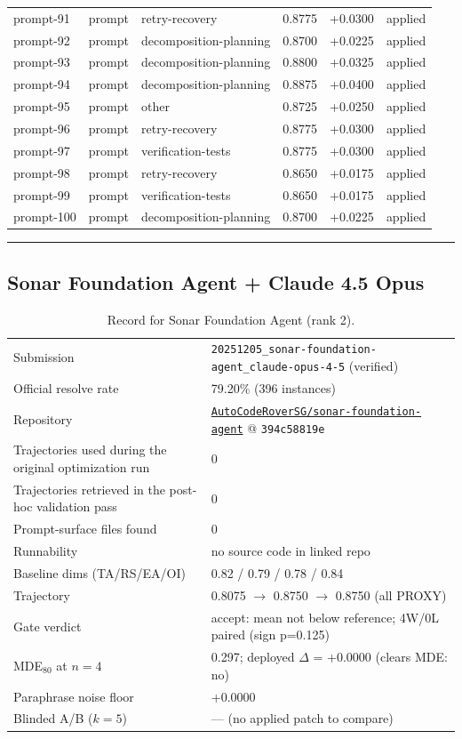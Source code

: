 \begin{center}
\begin{longtable}{llp{5.2cm}rrl}
prompt-91 & prompt & retry-recovery & 0.8775 & +0.0300 & applied \\
prompt-92 & prompt & decomposition-planning & 0.8700 & +0.0225 & applied \\
prompt-93 & prompt & decomposition-planning & 0.8800 & +0.0325 & applied \\
prompt-94 & prompt & decomposition-planning & 0.8875 & +0.0400 & applied \\
prompt-95 & prompt & other & 0.8725 & +0.0250 & applied \\
prompt-96 & prompt & retry-recovery & 0.8775 & +0.0300 & applied \\
prompt-97 & prompt & verification-tests & 0.8775 & +0.0300 & applied \\
prompt-98 & prompt & retry-recovery & 0.8650 & +0.0175 & applied \\
prompt-99 & prompt & verification-tests & 0.8650 & +0.0175 & applied \\
prompt-100 & prompt & decomposition-planning & 0.8700 & +0.0225 & applied \\
\bottomrule\end{longtable}\end{center}
\par\bigskip\hrule\bigskip
\subsection{Sonar Foundation Agent + Claude 4.5 Opus}
\label{app:agent2}
\begin{table}[H]\centering\scriptsize
\caption{Record for Sonar Foundation Agent (rank 2).}
\begin{tabular}{lp{8.2cm}}\toprule
Submission & \texttt{20251205\_\allowbreak{}sonar-foundation-agent\_\allowbreak{}claude-opus-4-5} (verified) \\
Official resolve rate & 79.20\% (396 instances) \\
Repository & \href{https://github.com/AutoCodeRoverSG/sonar-foundation-agent}{\texttt{AutoCodeRoverSG/sonar-foundation-agent}} @ \texttt{394c58819e} \\
Trajectories used during the original optimization run & 0 \\
Trajectories retrieved in the post-hoc validation pass & 0 \\
Prompt-surface files found & 0 \\
Runnability & no source code in linked repo \\
Baseline dims (TA/RS/EA/OI) & 0.82 / 0.79 / 0.78 / 0.84 \\
Trajectory & 0.8075 $\to$ 0.8750 $\to$ 0.8750 (all PROXY) \\
Gate verdict & accept: mean not below reference; 4W/0L paired (sign p=0.125) \\
MDE$_{80}$ at $n{=}4$ & 0.297; deployed $\Delta$ = +0.0000 (clears MDE: no) \\
Paraphrase noise floor & +0.0000 \\
Blinded A/B ($k{=}5$) & --- (no applied patch to compare) \\
\bottomrule\end{tabular}\end{table}
